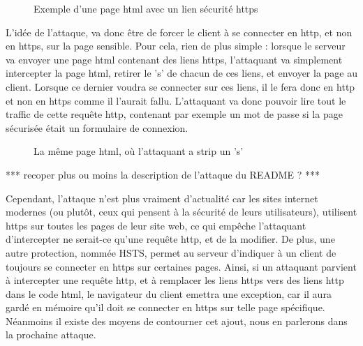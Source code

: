 \begin{figure}[H]
  \caption{Exemple d'une page html avec un lien sécurité https}
\end{figure}

L'idée de l'attaque, va donc être de forcer le client à se connecter en http, et non en https, sur la page sensible. Pour cela, rien de plus simple : lorsque le serveur va envoyer une page html contenant des liens https, l'attaquant va simplement intercepter la page html, retirer le 's' de chacun de ces liens, et envoyer la page au client. Lorsque ce dernier voudra se connecter sur ces liens, il le fera donc en http et non en https comme il l'aurait fallu. L'attaquant va donc pouvoir lire tout le traffic de cette requête http, contenant par exemple un mot de passe si la page sécurisée était un formulaire de connexion.

\begin{figure}[H]
  \caption{La même page html, où l'attaquant a strip un 's'}
\end{figure}

*** recoper plus ou moins la description de l'attaque du README ? ***

Cependant, l'attaque n'est plus vraiment d'actualité car les sites internet modernes (ou plutôt, ceux qui pensent à la sécurité de leurs utilisateurs), utilisent https sur toutes les pages de leur site web, ce qui empêche l'attaquant d'intercepter ne serait-ce qu'une requête http, et de la modifier. De plus, une autre protection, nommée HSTS, permet au serveur d'indiquer à un client de toujours se connecter en https sur certaines pages. Ainsi, si un attaquant parvient à intercepter une requête http, et à remplacer les liens https vers des liens http dans le code html, le navigateur du client emettra une exception, car il aura gardé en mémoire qu'il doit se connecter en https sur telle page spécifique. Néanmoins il existe des moyens de contourner cet ajout, nous en parlerons dans la prochaine attaque.
